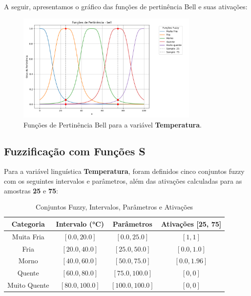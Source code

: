 \documentclass[a4paper,12pt]{article}
\begin{document}
A seguir, apresentamos o gráfico das funções de pertinência Bell e suas ativações:

\begin{figure}[H]
    \centering
    \includegraphics[width=0.8\textwidth]{img/funções_de_pertinência_bell_fuzzificado.png}
    \caption{Funções de Pertinência Bell para a variável \textbf{Temperatura}.}
\end{figure}

\subsection{Fuzzificação com Funções S}

Para a variável linguística \textbf{Temperatura}, foram definidos cinco conjuntos fuzzy com os seguintes intervalos e parâmetros, além das ativações calculadas para as amostras \textbf{25} e \textbf{75}:

\begin{table}[H]
\centering
\caption{Conjuntos Fuzzy, Intervalos, Parâmetros e Ativações}
\begin{tabular}{|c|c|c|c|}
\hline
\textbf{Categoria}    & \textbf{Intervalo (°C)} & \textbf{Parâmetros}       & \textbf{Ativações [25, 75]} \\ \hline
Muita Fria            & $[0.0, 20.0]$          & $[0.0, 25.0]$             & $[1, 1]$                   \\ \hline
Fria                  & $[20.0, 40.0]$         & $[25.0, 50.0]$            & $[0.0, 1.0]$               \\ \hline
Morno                 & $[40.0, 60.0]$         & $[50.0, 75.0]$            & $[0.0, 1.96]$              \\ \hline
Quente                & $[60.0, 80.0]$         & $[75.0, 100.0]$           & $[0, 0]$                   \\ \hline
Muito Quente          & $[80.0, 100.0]$        & $[100.0, 100.0]$          & $[0, 0]$                   \\ \hline
\end{tabular}
\end{table}
\end{document}
